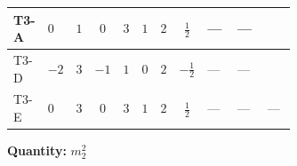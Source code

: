 \documentclass[8pt]{article}
\begin{document}
\begin{landscape}
\begin{longtable}{@{}llcccccc >{\raggedright\arraybackslash}p{0.21\linewidth} >{\raggedright\arraybackslash}p{0.21\linewidth} >{\raggedright\arraybackslash}p{0.21\linewidth}@{}}
\midrule
T3-A & $0$ & $1$ & $0$ & $3$ & $1$ & $2$ & $\frac{1}{2}$ & --- & --- & \scriptsize\adjustbox{max width=\linewidth}{$\begin{gathered} +2 {\lambda_{12}^{(1)}} {m_1^2}\end{gathered}$} \\
\midrule
T3-D & $-2$ & $3$ & $-1$ & $1$ & $0$ & $2$ & $-\frac{1}{2}$ & --- & --- & \scriptsize\adjustbox{max width=\linewidth}{$\begin{gathered} 6 {\lambda_{12}^{(1)}} {m_1^2}\end{gathered}$} \\
\midrule
T3-E & $0$ & $3$ & $0$ & $3$ & $1$ & $2$ & $\frac{1}{2}$ & --- & --- & --- \\
\midrule
\bottomrule
\end{longtable}
\clearpage
\noindent\textbf{Quantity: }$m_2^2$\par\smallskip

\end{landscape}
\end{document}
